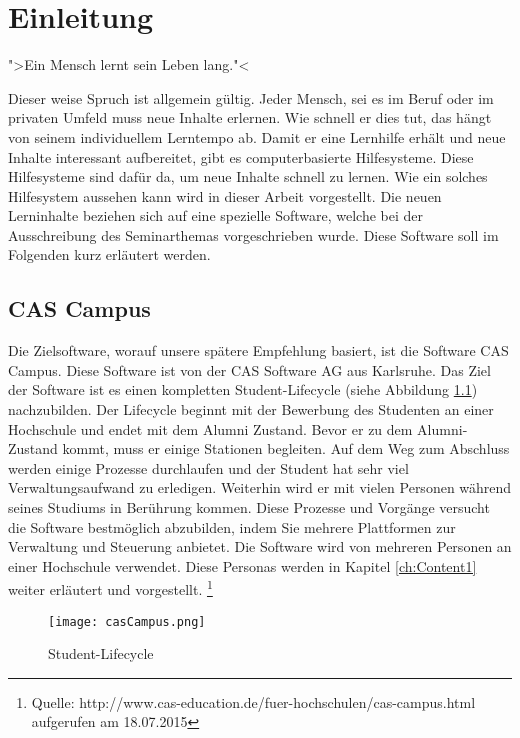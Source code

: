 
\chapter{Einleitung}
\label{ch:Introduction}
">Ein Mensch lernt sein Leben lang."< \par

Dieser weise Spruch ist allgemein gültig. Jeder Mensch, sei es im Beruf oder im privaten Umfeld muss neue Inhalte erlernen. Wie schnell er dies tut, das hängt von seinem individuellem Lerntempo ab. Damit er eine Lernhilfe erhält und neue Inhalte interessant aufbereitet, gibt es computerbasierte Hilfesysteme. Diese Hilfesysteme sind dafür da, um neue Inhalte schnell zu lernen. Wie ein solches Hilfesystem aussehen kann wird in dieser Arbeit vorgestellt. Die neuen Lerninhalte beziehen sich auf eine spezielle Software, welche bei der Ausschreibung des Seminarthemas vorgeschrieben wurde. Diese Software soll im Folgenden kurz erläutert werden.




\section{CAS Campus}
Die Zielsoftware, worauf unsere spätere Empfehlung basiert, ist die Software CAS Campus. Diese Software ist von der CAS Software AG aus Karlsruhe. Das Ziel der Software ist es einen kompletten Student-Lifecycle (siehe Abbildung \ref{img1:stdLife}) nachzubilden. Der Lifecycle beginnt mit der Bewerbung des Studenten an einer Hochschule und endet mit dem Alumni Zustand. Bevor er zu dem Alumni-Zustand kommt, muss er einige Stationen begleiten. Auf dem Weg zum Abschluss werden einige Prozesse durchlaufen und der Student hat sehr viel Verwaltungsaufwand zu erledigen. Weiterhin wird er mit vielen Personen während seines Studiums in Berührung kommen. Diese Prozesse und Vorgänge versucht die Software bestmöglich abzubilden, indem Sie mehrere Plattformen zur Verwaltung und Steuerung anbietet. Die Software wird von mehreren Personen an einer Hochschule verwendet. Diese Personas werden in Kapitel \ref{ch:Content1} weiter erläutert und vorgestellt. \footnote{Quelle: http://www.cas-education.de/fuer-hochschulen/cas-campus.html aufgerufen am 18.07.2015}
\begin{figure}[ht]
\begin{center}
\texttt{[image: casCampus.png]}
\caption{Student-Lifecycle}
\label{img1:stdLife}
\end{center}
\end{figure} 

